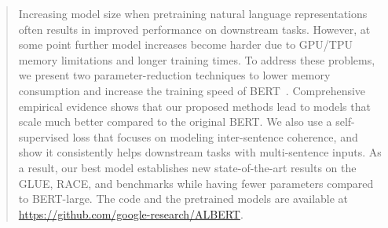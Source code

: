 %

\newcommand{\fix}{\marginpar{FIX}}
\newcommand{\new}{\marginpar{NEW}}

\iclrfinalcopy %



\maketitle

\begin{abstract}
Increasing model size when pretraining natural language representations often results in improved performance on downstream tasks. However, at some point further model increases become harder due to GPU/TPU memory limitations and longer training times. To address these problems,  we present two parameter-reduction techniques to lower memory consumption and increase the training speed of BERT~\citep{devlin2018bert}. Comprehensive empirical evidence shows that our proposed methods lead to models that scale much better compared to the original BERT. We also use a self-supervised loss that focuses on modeling inter-sentence coherence, and show it consistently helps downstream tasks with multi-sentence inputs. As a result, our best model establishes new state-of-the-art results on the GLUE, RACE, and \squad benchmarks while having fewer parameters compared to BERT-large. The code and the pretrained models are available at \url{ https://github.com/google-research/ALBERT}.
\end{abstract}

 





